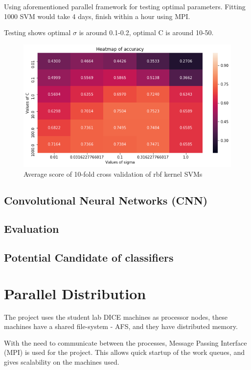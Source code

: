 \documentclass[bsc,logo,twoside,fullspacing,parskip]{infthesis}
\begin{document}
Using aforementioned parallel framework for testing optimal parameters. Fitting 1000 SVM would take 4 days, finish within a hour using MPI.

Testing shows optimal \(\sigma\) is around 0.1-0.2, optimal C is around 10-50.

\begin{figure}[!b]
\centering
    \includegraphics[scale=0.5]{graph/svmparameter.png}
    \caption{Average score of 10-fold cross validation of rbf kernel SVMs}
    \label{fig:svmparameter}
\end{figure}

\section{Convolutional Neural Networks (CNN)}
\section{Evaluation}
\section{Potential Candidate of classifiers}

\chapter{Parallel Distribution}

The project uses the student lab DICE machines as processor nodes, these machines have a shared file-system - AFS, and they have distributed memory. 

With the need to communicate between the processes, Message Passing Interface (MPI) is used for the project. This allows quick startup of the work queues, and gives scalability on the machines used.
\end{document}
